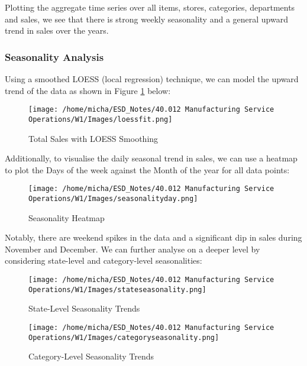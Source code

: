 \documentclass[12pt]{article}
\begin{document}
\noindent Plotting the aggregate time series over all items, stores, categories, departments and sales, we see that there is strong weekly seasonality and a general upward trend in sales over the years. 

\subsubsection*{Seasonality Analysis}

Using a smoothed LOESS (local regression) technique, we can model the upward trend of the data as shown in Figure \ref{fig:6-loessgraph} below: 

\begin{figure}[H]
    \centering
    \texttt{[image: /home/micha/ESD\_Notes/40.012 Manufacturing Service Operations/W1/Images/loessfit.png]}
    \caption{Total Sales with LOESS Smoothing}
    \label{fig:6-loessgraph}
\end{figure} 

Additionally, to visualise the daily seasonal trend in sales, we can use a heatmap to plot the Days of the week against the Month of the year for all data points: 

\begin{figure}[H]
    \centering
    \texttt{[image: /home/micha/ESD\_Notes/40.012 Manufacturing Service Operations/W1/Images/seasonalityday.png]}
    \caption{Seasonality Heatmap}
    \label{fig:6-seasonalityplot}
\end{figure} 

\noindent Notably, there are weekend spikes in the data and a significant dip in sales during November and December. We can further analyse on a deeper level by considering state-level and category-level seasonalities:

\begin{figure}[H]
    \centering
    \texttt{[image: /home/micha/ESD\_Notes/40.012 Manufacturing Service Operations/W1/Images/stateseasonality.png]}
    \caption{State-Level Seasonality Trends}
    \label{fig:6-stateseasonality}
\end{figure} 

\begin{figure}[H]
    \centering
    \texttt{[image: /home/micha/ESD\_Notes/40.012 Manufacturing Service Operations/W1/Images/categoryseasonality.png]}
    \caption{Category-Level Seasonality Trends}
    \label{fig:6-categoryseasonality}
\end{figure} 
\end{document}
